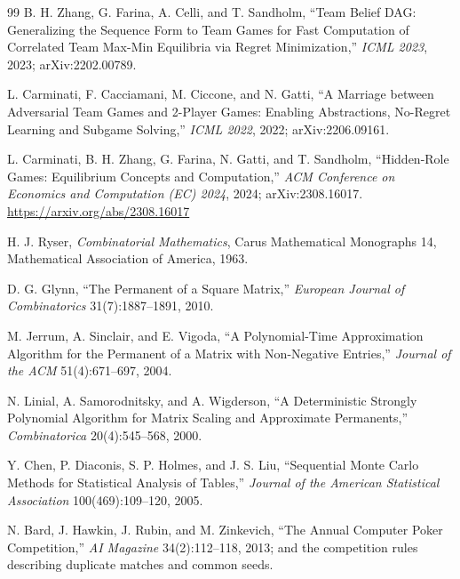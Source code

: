 \begin{thebibliography}{99}
B. H. Zhang, G. Farina, A. Celli, and T. Sandholm, ``Team Belief DAG:
Generalizing the Sequence Form to Team Games for Fast Computation of Correlated
Team Max-Min Equilibria via Regret Minimization,'' \emph{ICML 2023}, 2023;
arXiv:2202.00789.

L. Carminati, F. Cacciamani, M. Ciccone, and N. Gatti, ``A Marriage between
Adversarial Team Games and 2-Player Games: Enabling Abstractions, No-Regret
Learning and Subgame Solving,'' \emph{ICML 2022}, 2022; arXiv:2206.09161.

L. Carminati, B. H. Zhang, G. Farina, N. Gatti, and T. Sandholm, ``Hidden-Role
Games: Equilibrium Concepts and Computation,'' \emph{ACM Conference on Economics
and Computation (EC) 2024}, 2024; arXiv:2308.16017.\\
\url{https://arxiv.org/abs/2308.16017}


H. J. Ryser, \emph{Combinatorial Mathematics}, Carus Mathematical Monographs 14,
Mathematical Association of America, 1963.

D. G. Glynn, ``The Permanent of a Square Matrix,'' \emph{European Journal of
Combinatorics} 31(7):1887--1891, 2010.

M. Jerrum, A. Sinclair, and E. Vigoda, ``A Polynomial-Time Approximation
Algorithm for the Permanent of a Matrix with Non-Negative Entries,''
\emph{Journal of the ACM} 51(4):671--697, 2004.

N. Linial, A. Samorodnitsky, and A. Wigderson, ``A Deterministic Strongly
Polynomial Algorithm for Matrix Scaling and Approximate Permanents,''
\emph{Combinatorica} 20(4):545--568, 2000.

Y. Chen, P. Diaconis, S. P. Holmes, and J. S. Liu, ``Sequential Monte Carlo
Methods for Statistical Analysis of Tables,'' \emph{Journal of the American
Statistical Association} 100(469):109--120, 2005.


N. Bard, J. Hawkin, J. Rubin, and M. Zinkevich, ``The Annual Computer Poker
Competition,'' \emph{AI Magazine} 34(2):112--118, 2013; and the competition
rules describing duplicate matches and common seeds.


\end{thebibliography}
